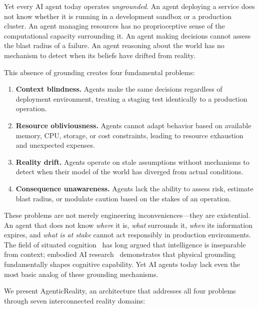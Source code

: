 \documentclass[10pt, twocolumn]{article}
\begin{document}
Yet every AI agent today operates \emph{ungrounded}. An agent deploying a service does not know whether it is running in a development sandbox or a production cluster. An agent managing resources has no proprioceptive sense of the computational capacity surrounding it. An agent making decisions cannot assess the blast radius of a failure. An agent reasoning about the world has no mechanism to detect when its beliefs have drifted from reality.

This absence of grounding creates four fundamental problems:

\begin{enumerate}[nosep, leftmargin=*]
  \item \textbf{Context blindness.} Agents make the same decisions regardless of deployment environment, treating a staging test identically to a production operation.
  \item \textbf{Resource obliviousness.} Agents cannot adapt behavior based on available memory, CPU, storage, or cost constraints, leading to resource exhaustion and unexpected expenses.
  \item \textbf{Reality drift.} Agents operate on stale assumptions without mechanisms to detect when their model of the world has diverged from actual conditions.
  \item \textbf{Consequence unawareness.} Agents lack the ability to assess risk, estimate blast radius, or modulate caution based on the stakes of an operation.
\end{enumerate}

These problems are not merely engineering inconveniences---they are existential. An agent that does not know \emph{where} it is, \emph{what} surrounds it, \emph{when} its information expires, and \emph{what is at stake} cannot act responsibly in production environments. The field of situated cognition~\cite{suchman1987plans, clancey1997situated} has long argued that intelligence is inseparable from context; embodied AI research~\cite{brooks1991intelligence, pfeifer2007understanding} demonstrates that physical grounding fundamentally shapes cognitive capability. Yet AI agents today lack even the most basic analog of these grounding mechanisms.

We present AgenticReality, an architecture that addresses all four problems through seven interconnected reality domains:
\end{document}
